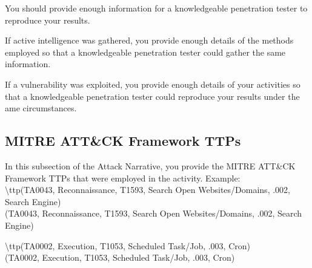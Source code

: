 \documentclass[notitlepage]{article}
\begin{document}
	
	You should provide enough information for a knowledgeable
	penetration tester to reproduce your results.
	
	If active intelligence was gathered, you provide enough details of the
	methods employed so that a knowledgeable penetration tester could
	gather the same information.
	
	If a vulnerability was exploited, you provide enough details of your
	activities so that a knowledgeable penetration tester could reproduce
	your results under the ame circumstances.
	
	\subsection{MITRE ATT{\&}CK Framework TTPs}
	
	In this subsection of the Attack Narrative, you provide the MITRE ATT{\&}CK Framework TTPs
	that were employed in the activity.
	Example: \\
	
	\indent\textbackslash ttp(TA0043, Reconnaissance, T1593, Search Open Websites/Domains, .002, Search Engine) \\
	
	\ttp(TA0043, Reconnaissance, T1593, Search Open Websites/Domains, .002, Search Engine)
	
	\indent\textbackslash ttp(TA0002, Execution, T1053, Scheduled Task/Job, .003, Cron) \\
	
	\ttp(TA0002, Execution, T1053, Scheduled Task/Job, .003, Cron) 
\end{document}
